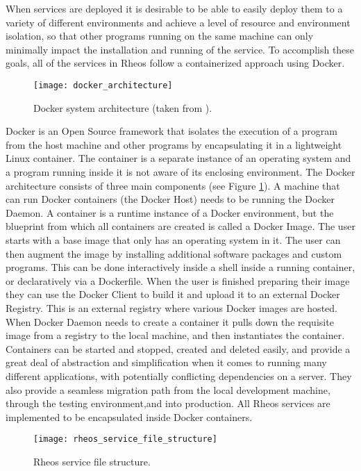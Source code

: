When services are deployed it is desirable to be able to easily deploy them to a variety of different environments and achieve a level of resource and environment isolation, so that other programs running on the same machine can only minimally impact the installation and running of the service. To accomplish these goals, all of the services in Rheos follow a containerized approach using Docker\autocite{merkel2014docker}.

\begin{figure}[H]
    \texttt{[image: docker\_architecture]}
    \centering
    \caption {Docker system architecture (taken from \autocite{dockerdoc}).}
    \label{fig:docker_architecture}
\end{figure}
\newpage
Docker is an Open Source framework that isolates the execution of a program from the host machine and other programs by encapsulating it in a lightweight Linux container. The container is a separate instance of an operating system and a program running inside it is not aware of its enclosing environment. The Docker architecture consists of three main components (see Figure \ref{fig:docker_architecture}). A machine that can run Docker containers (the Docker Host)
needs to be running the Docker Daemon. A container is a runtime instance of a Docker environment, but the blueprint from which all containers are created is called a Docker Image. The user starts with a base image that only has an operating system in it. The user can then augment the image by installing additional software packages and custom programs. This can be done interactively inside a shell inside a running container, or declaratively via a Dockerfile. When the user is finished preparing their image they can use the Docker Client to build it and upload it to an external Docker Registry. This is an external registry where various Docker images are hosted. When Docker Daemon needs to create a container it pulls down the requisite image from a registry to the local machine, and then instantiates the container. Containers can be started and stopped, created and deleted easily, and provide a great deal of abstraction and simplification when it comes to running many different applications, with potentially conflicting dependencies on a server. They also provide a seamless migration path from the local development machine, through the testing environment,and into production. All Rheos services are implemented to be encapsulated inside Docker containers.

\begin{figure}[H]
    \texttt{[image: rheos\_service\_file\_structure]}
    \centering
    \caption {Rheos service file structure.}
    \label{fig:rheos_service_file_structure}
\end{figure}

